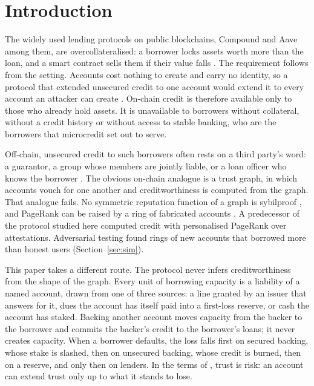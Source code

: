 \documentclass[acmsmall,nonacm,screen]{acmart}
\theoremstyle{acmdefinition}%
\begin{document}

\maketitle

\section{Introduction}\label{sec:intro}

The widely used lending protocols on public blockchains, Compound and Aave among them, are
overcollateralised: a borrower locks assets worth more than the loan, and a smart contract sells
them if their value falls \citep{leshner2019compound,aave2020}. The requirement follows from the
setting. Accounts cost
nothing to create and carry no identity, so a protocol that extended unsecured credit to one account
would extend it to every account an attacker can create \citep{douceur2002sybil}. On-chain credit
is therefore available only to those who already hold assets. It is unavailable to borrowers
without collateral, without a credit history or without access to stable banking, who are the
borrowers that microcredit set out to serve.

Off-chain, unsecured credit to such borrowers often rests on a third party's word: a guarantor, a
group whose members are jointly liable, or a loan officer who knows the borrower
\citep{stiglitz1990peer,besley1995group,ghatak1999joint}. The obvious on-chain analogue is a trust
graph, in which accounts vouch for one another and creditworthiness is computed from the graph. That
analogue fails. No symmetric reputation function of a graph is sybilproof
\citep{cheng2005sybilproof}, and PageRank can be raised by a ring of fabricated accounts
\citep{cheng2006pagerank}. A predecessor of the protocol studied here computed credit with
personalised PageRank over attestations. Adversarial testing found rings of new accounts that
borrowed more than honest users (Section~\ref{sec:sim}).

This paper takes a different route. The protocol never infers creditworthiness from the shape of
the graph. Every unit of borrowing capacity is a liability of a named account, drawn from one of
three sources: a line granted by an issuer that answers for it, dues the account has itself paid
into a first-loss reserve, or cash the account has staked. Backing another account moves capacity
from the backer to the borrower and commits the backer's credit to the borrower's loans; it never
creates capacity. When a borrower defaults, the loss falls first on secured backing, whose stake is
slashed, then on unsecured backing, whose credit is burned, then on a reserve, and only then on
lenders. In the terms of \citet{litos2017trust}, trust is risk: an account can extend trust only up
to what it stands to lose.
\end{document}
